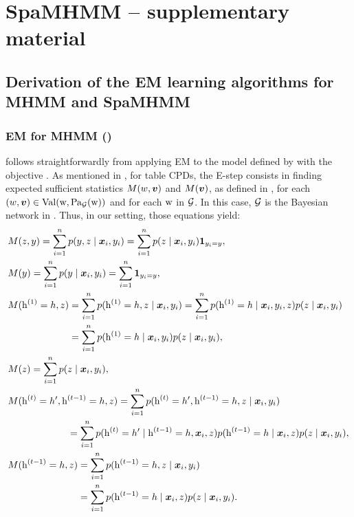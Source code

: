 
\chapter{SpaMHMM -- supplementary material} %

\label{appendix:spamhmm} %

\section{Derivation of the EM learning algorithms for MHMM and SpaMHMM}

\subsection{EM for MHMM ()}
\label{sec:proof_em_noreg}
 follows straightforwardly from applying EM to the model defined by  with the objective . As mentioned in , for table CPDs, the E-step consists in finding expected sufficient statistics $M(w,{\bm{v}})$ and $M({\bm{v}})$, as defined in , for each $(w,{\bm{v}}) \in \mathrm{Val}({\textnormal{w}},\mathrm{Pa}_{\mathcal{G}}({\textnormal{w}}))$ and for each ${\textnormal{w}}$ in ${\mathcal{G}}$. In this case, ${\mathcal{G}}$ is the Bayesian network in . Thus, in our setting, those equations yield:
\begingroup
\allowdisplaybreaks
\begin{align}
	&M(z,y) = \sum_{i=1}^{n} p(y, z \mid \vx_i, y_i) = \sum_{i=1}^{n} p(z \mid \vx_i, y_i) \1_{y_i=y}, \\
	&M(y) = \sum_{i=1}^{n} p(y \mid \vx_i, y_i) = \sum_{i=1}^{n} \1_{y_i=y}, \\
	&M(\rh^{(1)}=h, z) = \sum_{i=1}^{n} p(\rh^{(1)}=h, z \mid \vx_i, y_i) = \sum_{i=1}^{n} p(\rh^{(1)}=h \mid \vx_i, y_i, z) p(z \mid \vx_i, y_i) \nonumber\\
	&\hphantom{M(\rh^{(1)}=h,z)} = \sum_{i=1}^{n} p(\rh^{(1)}=h \mid \vx_i, y_i) p(z \mid \vx_i, y_i), \\
	&M(z) = \sum_{i=1}^{n} p(z \mid \vx_i, y_i), \\
	&M(\rh^{(t)}=h', \rh^{(t-1)}=h, z) = \sum_{i=1}^{n} p(\rh^{(t)}=h', \rh^{(t-1)}=h, z \mid \vx_i, y_i) \nonumber\\
	&\hphantom{M(\rh^{(t-1)}=h, } = \sum_{i=1}^{n} p(\rh^{(t)}=h' \mid \rh^{(t-1)}=h, \vx_i, z) p(\rh^{(t-1)}=h \mid \vx_i, z) p(z \mid \vx_i, y_i), \\
	&M(\rh^{(t-1)}=h, z) = \sum_{i=1}^{n} p(\rh^{(t-1)}=h, z \mid \vx_i, y_i) \nonumber\\
	&\hphantom{M(\rh^{(t-1)}=h, z)} = \sum_{i=1}^{n} p(\rh^{(t-1)}=h \mid \vx_i, z) p(z \mid \vx_i, y_i).
\end{align}
